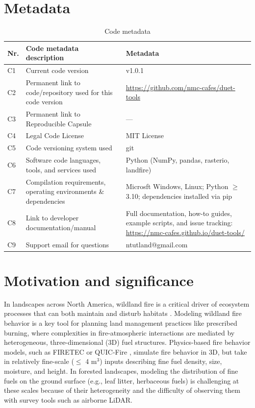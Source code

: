 \documentclass[preprint,12pt,a4paper]{elsarticle}
\begin{document}
\section*{Metadata}
\begin{table}[!h]
\begin{tabular}{|l|p{6.5cm}|p{6.5cm}|}
\hline
\textbf{Nr.} & \textbf{Code metadata description} & \textbf{Metadata} \\
\hline
C1 & Current code version & v1.0.1 \\
\hline
C2 & Permanent link to code/repository used for this code version & \url{https://github.com/nmc-cafes/duet-tools} \\
\hline
C3 & Permanent link to Reproducible Capsule & --- \\
\hline
C4 & Legal Code License & MIT License \\
\hline
C5 & Code versioning system used & git \\
\hline
C6 & Software code languages, tools, and services used & Python (NumPy, pandas, rasterio, landfire) \\
\hline
C7 & Compilation requirements, operating environments \& dependencies & Microsft Windows, Linux; Python $\geq$ 3.10; dependencies installed via pip \\
\hline
C8 & Link to developer documentation/manual & Full documentation, how-to guides, example scripts, and issue tracking: \url{https://nmc-cafes.github.io/duet-tools/} \\
\hline
C9 & Support email for questions & ntutland@gmail.com \\
\hline
\end{tabular}
\caption{Code metadata}
\label{codeMetadata}
\end{table}

\section{Motivation and significance}
In landscapes across North America, wildland fire is a critical driver of ecosystem processes that can both maintain and disturb habitats \cite{keeley_ecological_2009}.
Modeling wildland fire behavior is a key tool for planning land management practices like prescribed burning, where complexities in fire-atmospheric interactions are mediated by heterogeneous, three-dimensional (3D) fuel structures.
Physics-based fire behavior models, such as FIRETEC \cite{linn_studying_2002} or QUIC-Fire \cite{linn_quic-fire_2020}, simulate fire behavior in 3D, but take in relatively fine-scale ($\leq$ 4 m$^3$) inputs describing fine fuel density, size, moisture, and height.
In forested landscapes, modeling the distribution of fine fuels on the ground surface (e.g., leaf litter, herbaceous fuels) is challenging at these scales because of their heterogeneity and the difficulty of observing them with survey tools such as airborne LiDAR.\newline
\end{document}
